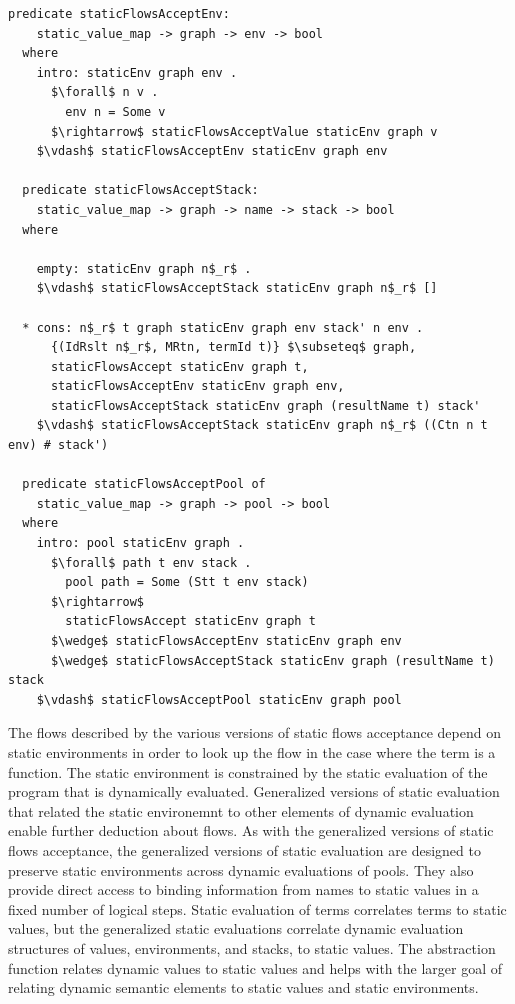 \documentclass[letterpaper, 11pt]{report}
\begin{document}
\begin{lstlisting}[language=logic, mathescape]
  predicate staticFlowsAcceptEnv:
    static_value_map -> graph -> env -> bool
  where 
    intro: staticEnv graph env .
      $\forall$ n v . 
        env n = Some v
      $\rightarrow$ staticFlowsAcceptValue staticEnv graph v
    $\vdash$ staticFlowsAcceptEnv staticEnv graph env

  predicate staticFlowsAcceptStack:
    static_value_map -> graph -> name -> stack -> bool
  where

    empty: staticEnv graph n$_r$ .
    $\vdash$ staticFlowsAcceptStack staticEnv graph n$_r$ []

  * cons: n$_r$ t graph staticEnv graph env stack' n env .
      {(IdRslt n$_r$, MRtn, termId t)} $\subseteq$ graph,
      staticFlowsAccept staticEnv graph t,
      staticFlowsAcceptEnv staticEnv graph env,
      staticFlowsAcceptStack staticEnv graph (resultName t) stack' 
    $\vdash$ staticFlowsAcceptStack staticEnv graph n$_r$ ((Ctn n t env) # stack')

  predicate staticFlowsAcceptPool of
    static_value_map -> graph -> pool -> bool
  where
    intro: pool staticEnv graph .
      $\forall$ path t env stack .
        pool path = Some (Stt t env stack)
      $\rightarrow$
        staticFlowsAccept staticEnv graph t
      $\wedge$ staticFlowsAcceptEnv staticEnv graph env
      $\wedge$ staticFlowsAcceptStack staticEnv graph (resultName t) stack
    $\vdash$ staticFlowsAcceptPool staticEnv graph pool
\end{lstlisting}

The flows described by the various versions of static flows acceptance depend on static
environments in order to look up the flow in the case where the term is a function.
The static environment is constrained by the static evaluation of the program that is dynamically evaluated.
Generalized versions of static evaluation that related the static environemnt to other elements of dynamic evaluation
enable further deduction about flows.
As with the generalized versions of static flows acceptance,
the generalized versions of static evaluation are designed to
preserve static environments across dynamic evaluations of pools.
They also provide direct access to binding information from names
to static values in a fixed number of logical steps. Static evaluation of terms correlates
terms to static values, but the generalized static evaluations correlate dynamic
evaluation structures of values, environments, and stacks, to static values.
The abstraction function relates dynamic values to static values and helps with the larger goal of
relating dynamic semantic elements to static values and static environments.   
\end{document}
